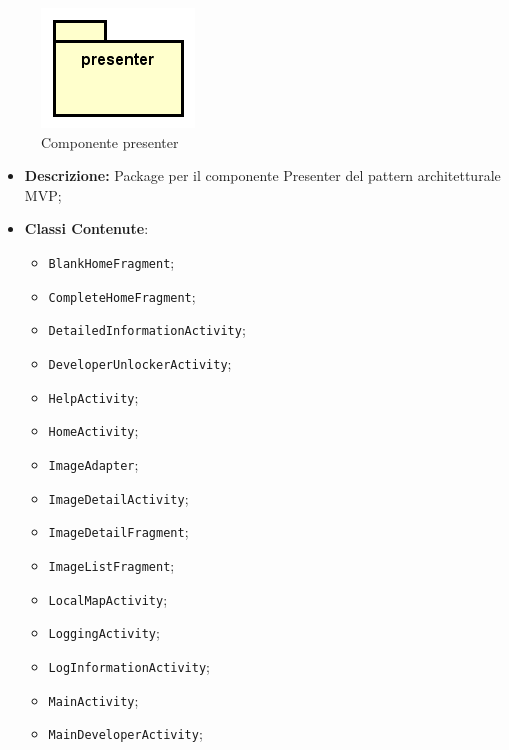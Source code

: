\documentclass[../DefinizioneDiProdotto.tex]{subfiles}
\begin{document}
\begin{figure}[H]
	\centering
	\includegraphics[width=\maxwidth]{img/package/presenter.png}
	\caption{Componente presenter}\label{fig:presenter} 
\end{figure}
\begin{itemize}
	\item \textbf{Descrizione:} Package per il componente Presenter del pattern architetturale MVP;
	\item \textbf{Classi Contenute}:
	\begin{itemize}
		\item \texttt{BlankHomeFragment};
		
		\item \texttt{CompleteHomeFragment};
		
		\item \texttt{DetailedInformationActivity};
		
		\item \texttt{DeveloperUnlockerActivity};
		
		\item \texttt{HelpActivity};
		
		\item \texttt{HomeActivity};
		
		\item \texttt{ImageAdapter};
		
		\item \texttt{ImageDetailActivity};
		
		\item \texttt{ImageDetailFragment};
		
		\item \texttt{ImageListFragment};
		
		\item \texttt{LocalMapActivity};
		
		\item \texttt{LoggingActivity};
		
		\item \texttt{LogInformationActivity};
		
		\item \texttt{MainActivity};
		
		\item \texttt{MainDeveloperActivity};
		

\end{itemize}
\end{itemize}
\end{document}
